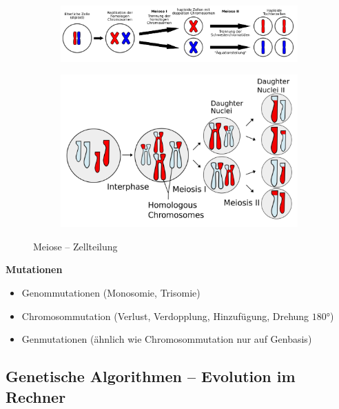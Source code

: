 \begin{figure}
	\centering
	\begin{subfigure}{\textwidth}
	\centering
	\includegraphics[width=\textwidth]{figures/meiose.png}
	\end{subfigure}
	\begin{subfigure}{.6\textwidth}
	\centering
	\includegraphics[width=\textwidth]{figures/meiose_1.png}
	\end{subfigure}
	\caption{Meiose -- Zellteilung}
\end{figure}
%
\textbf{Mutationen}
\begin{itemize}
	\item Genommutationen (Monosomie, Trisomie)
	\item Chromosommutation (Verlust, Verdopplung, Hinzufügung, Drehung $180°$)
	\item Genmutationen (ähnlich wie Chromosommutation nur auf Genbasis)
\end{itemize}

\subsection{Genetische Algorithmen -- \glqq Evolution im Rechner\grqq}

